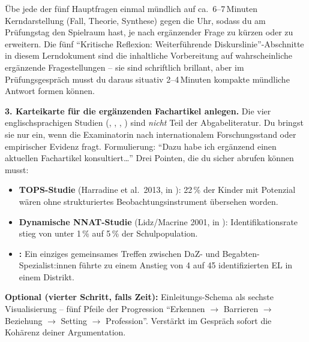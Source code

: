\documentclass[ngerman, a4paper]{article}
\begin{document}
\begin{todojuni}
Übe jede der fünf Hauptfragen einmal mündlich auf ca.\ 6--7\,Minuten Kerndarstellung (Fall, Theorie, Synthese) gegen die Uhr, sodass du am Prüfungstag den Spielraum hast, je nach ergänzender Frage zu kürzen oder zu erweitern. Die fünf \enquote{Kritische Reflexion: Weiterführende Diskurslinie}-Abschnitte in diesem Lerndokument sind die inhaltliche Vorbereitung auf wahrscheinliche ergänzende Fragestellungen -- sie sind schriftlich brillant, aber im Prüfungsgespräch musst du daraus situativ 2--4\,Minuten kompakte mündliche Antwort formen können.

\medskip
\textbf{3. Karteikarte für die ergänzenden Fachartikel anlegen.}
Die vier englischsprachigen Studien (\textcite{mun2020identifying}, \textcite{gubbins2020promising}, \textcite{alhroub2021utility}, \textcite{alodat2025equitable}) sind \textit{nicht} Teil der Abgabeliteratur. Du bringst sie nur ein, wenn die Examinatorin nach internationalem Forschungsstand oder empirischer Evidenz fragt. Formulierung: \enquote{Dazu habe ich ergänzend einen aktuellen Fachartikel konsultiert\ldots} Drei Pointen, die du sicher abrufen können musst:
\begin{itemize}\setlength{\itemsep}{0pt}
  \item \textbf{TOPS-Studie} (Harradine et al.\ 2013, in \textcite{mun2020identifying}): 22\,\% der Kinder mit Potenzial wären ohne strukturiertes Beobachtungsinstrument übersehen worden.
  \item \textbf{Dynamische NNAT-Studie} (Lidz/Macrine 2001, in \textcite{mun2020identifying}): Identifikationsrate stieg von unter 1\,\% auf 5\,\% der Schulpopulation.
  \item \textbf{\textcite{gubbins2020promising}:} Ein einziges gemeinsames Treffen zwischen DaZ- und Begabten-Spezialist:innen führte zu einem Anstieg von 4 auf 45 identifizierten EL in einem Distrikt.
\end{itemize}

\medskip
\textbf{Optional (vierter Schritt, falls Zeit):}
Einleitungs-Schema als sechste Visualisierung -- fünf Pfeile der Progression \enquote{Erkennen $\rightarrow$ Barrieren $\rightarrow$ Beziehung $\rightarrow$ Setting $\rightarrow$ Profession}. Verstärkt im Gespräch sofort die Kohärenz deiner Argumentation.
\end{todojuni}
\end{document}
